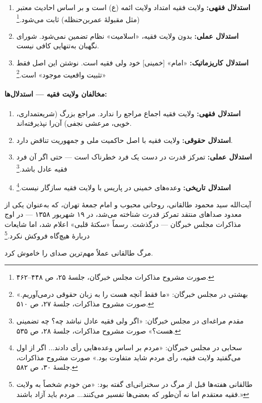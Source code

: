 \begin{enumerate}[label=\textcolor{cPrimary}{\bfseries\arabic*.}, rightmargin=2em]
    \item \textbf{استدلال فقهی:} ولایت فقیه امتداد ولایت ائمه (ع) است و بر اساس احادیث معتبر (مثل مقبولهٔ عمر‌بن‌حنظله) ثابت می‌شود.\footnote{صورت مشروح مذاکرات مجلس خبرگان، جلسهٔ ۲۵، ص ۴۴۸–۴۶۲.}
    
    \item \textbf{استدلال عملی:} بدون ولایت فقیه، «اسلامیت» نظام تضمین نمی‌شود. شورای نگهبان به‌تنهایی کافی نیست.
    
    \item \textbf{استدلال کاریزماتیک:} «امام» [خمینی] خود ولی فقیه است. نوشتن این اصل فقط «تثبیت واقعیت موجود» است.\footnote{بهشتی در مجلس خبرگان: «ما فقط آنچه هست را به زبان حقوقی درمی‌آوریم.» صورت مشروح مذاکرات، جلسهٔ ۲۷، ص ۵۱۰.}
\end{enumerate}

\paragraph{مخالفان ولایت فقیه — استدلال‌ها:}

\begin{enumerate}[label=\textcolor{cAccent}{\bfseries\arabic*.}, rightmargin=2em]
    \item \textbf{استدلال فقهی:} ولایت فقیه اجماع مراجع را ندارد. مراجع بزرگ (شریعتمداری، خویی، مرعشی نجفی) آن‌را نپذیرفته‌اند.
    
    \item \textbf{استدلال حقوقی:} ولایت فقیه با اصل حاکمیت ملی و جمهوریت تناقض دارد.
    
    \item \textbf{استدلال عملی:} تمرکز قدرت در دست یک فرد خطرناک است — حتی اگر آن فرد فقیه عادل باشد.\footnote{مقدم مراغه‌ای در مجلس خبرگان: «اگر ولی فقیه عادل نباشد چه؟ چه تضمینی هست؟» صورت مشروح مذاکرات، جلسهٔ ۲۸، ص ۵۳۵.}
    
    \item \textbf{استدلال تاریخی:} وعده‌های خمینی در پاریس با ولایت فقیه سازگار نیست.\footnote{سحابی در مجلس خبرگان: «مردم بر اساس وعده‌هایی رأی دادند... اگر از اول می‌گفتید ولایت فقیه، رأی مردم شاید متفاوت بود.» صورت مشروح مذاکرات، جلسهٔ ۳۰، ص ۵۸۲.}
\end{enumerate}

\begin{warningBox}
آیت‌الله سید محمود طالقانی، روحانی محبوب و امام جمعهٔ تهران، که به‌عنوان یکی از معدود صداهای منتقد تمرکز قدرت شناخته می‌شد، در ۱۹ شهریور ۱۳۵۸ — در اوج مذاکرات مجلس خبرگان — درگذشت. رسماً «سکتهٔ قلبی» اعلام شد، اما شایعات دربارهٔ  هیچ‌گاه فروکش نکرد.\footnote{طالقانی هفته‌ها قبل از مرگ در سخنرانی‌ای گفته بود: «من خودم شخصاً به ولایت فقیه معتقدم اما نه آن‌طور که بعضی‌ها تفسیر می‌کنند... مردم باید آزاد باشند.» }

مرگ طالقانی عملاً مهم‌ترین صدای  را خاموش کرد.
\end{warningBox}

